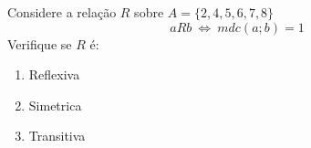 \item  Considere a relação $R$ sobre  $A=\{2,4,5,6,7,8\}$
 \[  aRb\ \Leftrightarrow\  mdc(a; b) = 1\]
 Verifique se $R$ é:
\begin{multicols}{3}
\begin{enumerate}
\item Reflexiva
\item Simetrica
\item Transitiva
\end{enumerate} 
\end{multicols}
